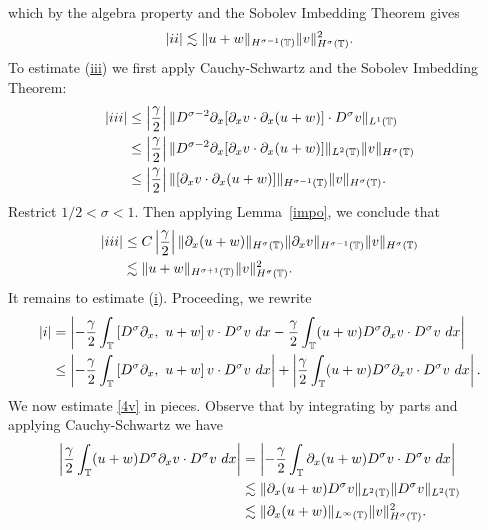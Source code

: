 which by the algebra property and the Sobolev
Imbedding Theorem gives
\begin{equation}
\begin{split}
|ii| \lesssim \|u+w\|_{H^{\sigma -1}(\mathbb{T})} \|v\|_{H^\sigma(\mathbb{T})}^2.
\label{3v}
\end{split}
\end{equation}
To estimate (\hyperref[2v]{iii}) we first apply
Cauchy-Schwartz and the Sobolev Imbedding Theorem:
\begin{equation*}
\begin{split}
|iii| & \le	\left | \frac{\gamma}{2} \right | \|D^{\sigma -2} \partial_x
[\partial_x v \cdot \partial_x (u+w)] \cdot D^\sigma v  \|_{L^1(\mathbb{T})} 
\\
& \le  \left | \frac{\gamma}{2} \right | \|D^{\sigma -2} \partial_x
[\partial_x v \cdot \partial_x (u+w)] \|_{L^2(\mathbb{T})}
\|v\|_{H^\sigma(\mathbb{T})}
\\
& \le \left |\frac{\gamma}{2} \right|
\|[\partial_x v \cdot \partial_x (u+w)] \|_{H^{\sigma -1}(\mathbb{T})}
\|v\|_{H^\sigma(\mathbb{T})}.
\end{split}
\end{equation*}
Restrict $1/2 < \sigma < 1$. Then applying Lemma~\ref{impo}, we conclude
that
\begin{equation}
\begin{split}
|iii|
& \le C \left | \frac{\gamma}{2} \right |
\|\partial_x(u+w) \|_{H^{\sigma}(\mathbb{T})}
\|\partial_x v\|_{H^{\sigma -1}(\mathbb{T})} \|v\|_{H^\sigma(\mathbb{T})}
\\
& \lesssim \|u+w \|_{H^{\sigma + 1}(\mathbb{T})}
\|v\|_{H^\sigma(\mathbb{T})}^2.
\label{3'v}
\end{split}
\end{equation}
It remains to estimate (\hyperref[2v]{i}).
Proceeding, we rewrite
\begin{equation}
\begin{split}
|i| & =
\left |
-\frac{\gamma}{2} \int_{\mathbb{T}} \left[ D^\sigma \partial_x, \ u+w \right]v \cdot
D^\sigma v \ dx - \frac{\gamma}{2} \int_{\mathbb{T}} (u+w) D^\sigma
\partial_x v \cdot D^\sigma v\ dx
\right | 
\\
& \le \left |
-\frac{\gamma}{2} \int_{\mathbb{T}} \left[ D^\sigma \partial_x, \ u+w \right]v \cdot
D^\sigma v \ dx \right |
+ \left | \frac{\gamma}{2} \int_{\mathbb{T}} (u+w) D^\sigma \partial_x v
\cdot D^\sigma v\
dx \right |.
\label{4v}
\end{split}
\end{equation}
We now estimate \eqref{4v} in pieces. Observe that by integrating by parts
and applying Cauchy-Schwartz we have
\begin{equation}
\begin{split}
\left | \frac{\gamma}{2}\int_{\mathbb{T}} (u+w) D^\sigma \partial_x v \cdot
D^\sigma v \ dx \right |
& = \left | -\frac{\gamma}{2} \int_{\mathbb{T}} \partial_x (u+w) D^\sigma v
\cdot D^\sigma v \ dx \right |
\\
& \lesssim \|\partial_x (u+w) D^\sigma v \|_{L^2(\mathbb{T})} \|D^\sigma
v\|_{L^2(\mathbb{T})}
\\
& \lesssim \|\partial_x (u+w)\|_{L^\infty(\mathbb{T})}
\|v\|_{H^\sigma(\mathbb{T})}^2.
\label{4'v}
\end{split}
\end{equation}
